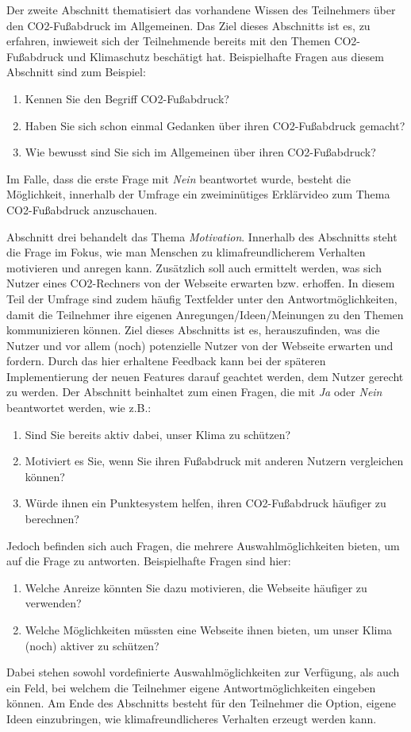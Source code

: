 Der zweite Abschnitt thematisiert das vorhandene Wissen des Teilnehmers über den CO2-Fußabdruck im Allgemeinen.
Das Ziel dieses Abschnitts ist es, zu erfahren, inwieweit sich der Teilnehmende bereits mit den Themen CO2-Fußabdruck und Klimaschutz beschätigt hat.
Beispielhafte Fragen aus diesem Abschnitt sind zum Beispiel:
\begin{enumerate}
    \item Kennen Sie den Begriff CO2-Fußabdruck?
    \item Haben Sie sich schon einmal Gedanken über ihren CO2-Fußabdruck gemacht?
    \item Wie bewusst sind Sie sich im Allgemeinen über ihren CO2-Fußabdruck?
\end{enumerate}
Im Falle, dass die erste Frage mit \textit{Nein} beantwortet wurde, besteht die Möglichkeit, innerhalb der Umfrage ein zweiminütiges Erklärvideo zum Thema CO2-Fußabdruck anzuschauen.


Abschnitt drei behandelt das Thema \textit{Motivation}.
Innerhalb des Abschnitts steht die Frage im Fokus, wie man Menschen zu klimafreundlicherem Verhalten motivieren und anregen kann.
Zusätzlich soll auch ermittelt werden, was sich Nutzer eines CO2-Rechners von der Webseite erwarten bzw. erhoffen.
In diesem Teil der Umfrage sind zudem häufig Textfelder unter den Antwortmöglichkeiten, damit die Teilnehmer ihre eigenen Anregungen/Ideen/Meinungen zu den Themen kommunizieren können.
Ziel dieses Abschnitts ist es, herauszufinden, was die Nutzer und vor allem (noch) potenzielle Nutzer von der Webseite erwarten und fordern.
Durch das hier erhaltene Feedback kann bei der späteren Implementierung der neuen Features darauf geachtet werden, dem Nutzer gerecht zu werden.
Der Abschnitt beinhaltet zum einen Fragen, die mit \textit{Ja} oder \textit{Nein} beantwortet werden, wie z.B.:
\begin{enumerate}
    \item Sind Sie bereits aktiv dabei, unser Klima zu schützen?
    \item Motiviert es Sie, wenn Sie ihren Fußabdruck mit anderen Nutzern vergleichen können?
    \item Würde ihnen ein Punktesystem helfen, ihren CO2-Fußabdruck häufiger zu berechnen?
\end{enumerate}
Jedoch befinden sich auch Fragen, die mehrere Auswahlmöglichkeiten bieten, um auf die Frage zu antworten.
Beispielhafte Fragen sind hier:
\begin{enumerate}
    \item Welche Anreize könnten Sie dazu motivieren, die Webseite häufiger zu verwenden?
    \item Welche Möglichkeiten müssten eine Webseite ihnen bieten, um unser Klima (noch) aktiver zu schützen?
\end{enumerate}
Dabei stehen sowohl vordefinierte Auswahlmöglichkeiten zur Verfügung, als auch ein Feld, bei welchem die Teilnehmer eigene Antwortmöglichkeiten eingeben können.
Am Ende des Abschnitts besteht für den Teilnehmer die Option, eigene Ideen einzubringen, wie klimafreundlicheres Verhalten erzeugt werden kann.


